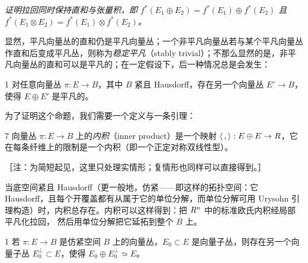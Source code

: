  \emph{证明拉回同时保持直和与张量积，即 $f^*(E_1\oplus E_2)=f^*(E_1)\oplus f^*(E_2)$ 且 $f^*(E_1\otimes E_2)=f^*(E_1)\otimes f^*(E_2)$。}

显然，平凡向量丛的直和仍是平凡向量丛；一个非平凡向量丛若与某个平凡向量丛作直和后变成平凡丛，则称为\emph{稳定平凡}（stably trivial）；不那么显然的是，非平凡向量丛的直和可以是平凡的；在一定假设下，后一种情况总是会发生：

\begin{prop}{1}
对任意向量丛 $\pi: E\to B$，其中 $B$ 紧且 Hausdorff，存在另一个向量丛 $E'\to B$，使得 $E\oplus E'$ 是平凡的。
\end{prop}

为了证明这个命题，我们需要一个定义与一条引理：

\begin{defn}{7}
向量丛 $\pi: E\to B$ 上的\emph{内积}（inner product）是一个映射 $\langle\,,\rangle: E\oplus E\to R$，它在每条纤维上的限制是一个内积（即一个正定对称双线性型）。
\end{defn}

［注：为简短起见，这里只处理实情形；复情形也同样可以直接得到。］


当底空间紧且 Hausdorff（更一般地，仿紧——即这样的拓扑空间：它 Hausdorff，且每个开覆盖都有从属于它的单位分解，而单位分解可用 Urysohn 引理构造）时，内积总存在。内积可以这样得到：把 $R^n$ 中的标准欧氏内积经局部平凡化拉回，
然后用单位分解把它延拓到整个 $B$ 上。

\begin{lem}{1}
若 $\pi: E\to B$ 是仿紧空间 $B$ 上的向量丛，$E_0\subset E$ 是向量子丛，则存在另一个向量子丛 $E_0^\perp\subset E$，使得 $E_0\oplus E_0^\perp\simeq E$。
\end{lem}

